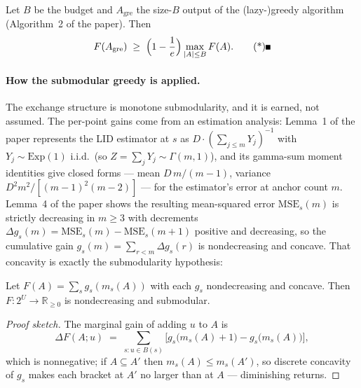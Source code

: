 \begin{theorem}
\label{thm:exc-031-gre}
Let $B$ be the budget and $A_{\mathrm{gre}}$ the size-$B$ output of the (lazy-)greedy
algorithm (Algorithm~2 of the paper). Then
\[
F(A_{\mathrm{gre}}) \;\ge\; \Bigl(1-\frac{1}{e}\Bigr)\max_{|A|\le B} F(A). \eopm
\]
\end{theorem}

\paragraph{How the submodular greedy is applied.}
The exchange structure is monotone submodularity, and it is earned, not assumed. The
per-point gains come from an estimation analysis: Lemma~1 of the paper represents the
LID estimator at $s$ as $D\cdot(\sum_{j\le m}Y_j)^{-1}$ with $Y_j\sim\mathrm{Exp}(1)$
i.i.d.\ (so $Z=\sum_j Y_j\sim\Gamma(m,1)$), and its gamma-sum moment identities give
closed forms --- mean $D\,m/(m-1)$, variance $D^{2}m^{2}/[(m-1)^{2}(m-2)]$ --- for the
estimator's error at anchor count $m$. Lemma~4 of the paper shows the resulting
mean-squared error $\mathrm{MSE}_s(m)$ is strictly decreasing in $m\ge 3$ with
decrements $\Delta g_s(m) = \mathrm{MSE}_s(m)-\mathrm{MSE}_s(m+1)$ positive and
decreasing, so the cumulative gain $g_s(m)=\sum_{r<m}\Delta g_s(r)$ is nondecreasing
and concave. That concavity is exactly the submodularity hypothesis:

\begin{lemma}\label{lem:exc-031-sub}
Let $F(A) = \sum_{s} g_s(m_s(A))$ with each $g_s$ nondecreasing and concave. Then
$F\colon 2^{U}\to\mathbb{R}_{\ge 0}$ is nondecreasing and submodular. \eop
\end{lemma}

\begin{proof}[Proof sketch]
The marginal gain of adding $u$ to $A$ is
\[
\Delta F(A;u) \;=\; \sum_{s\colon u\in B(s)}\bigl[g_s\bigl(m_s(A)+1\bigr)-g_s\bigl(m_s(A)\bigr)\bigr],
\]
which is nonnegative; if $A\subseteq A'$ then $m_s(A)\le m_s(A')$, so discrete concavity of $g_s$ makes
each bracket at $A'$ no larger than at $A$ --- diminishing returns.
\end{proof}

